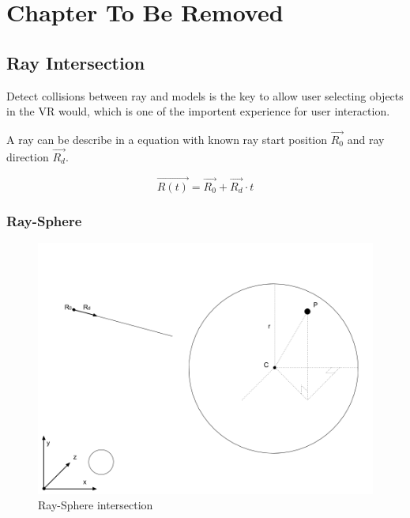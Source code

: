 \label{ChapterX}
\chapter{Chapter To Be Removed}

\section{Ray Intersection}

Detect collisions between ray and models is the key to allow user selecting objects in the VR would, which is one of the importent experience for user interaction.

A ray can be describe in a equation with known ray start position \emph{$\overrightarrow{R_0}$} and ray direction \emph{$\overrightarrow{R_d}$}.

\begin{equation}\label{equ:ray-t}
\overrightarrow{R(t)} = \overrightarrow{R_0} + \overrightarrow{R_d} \cdot t
\end{equation}

\subsection{Ray-Sphere}

\begin{figure}[h!]\label{fig:ray-sphere}
\centering
\includegraphics[width=\linewidth]{Figures/ray-sphere-intersection.png}
\decoRule
\caption[ray-sphere-intersection]{Ray-Sphere intersection}
\end{figure}

